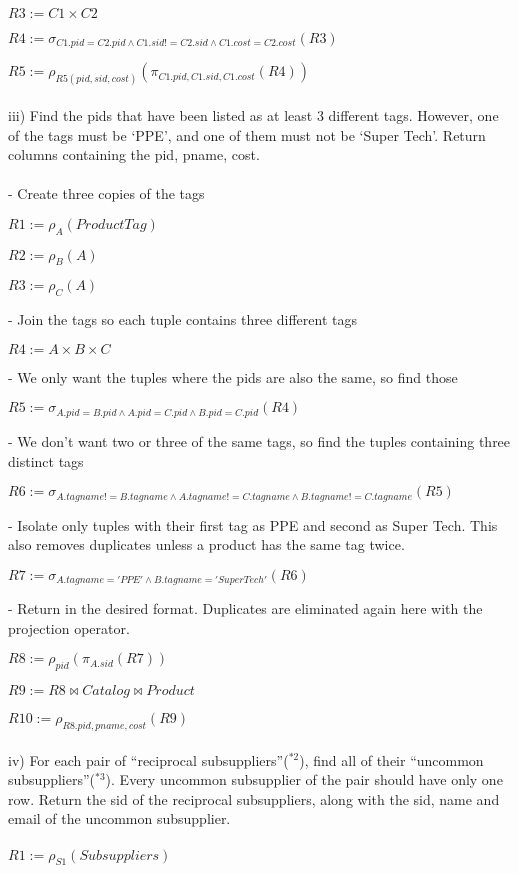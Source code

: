 \documentclass[10pt]{article}
\begin{document}
$R3 := C1 \times C2$

$R4 := \sigma_{C1.pid = C2.pid \wedge C1.sid != C2.sid \wedge C1.cost = C2.cost}(R3)$

$R5 := \rho_{R5(pid, sid, cost)}(\pi_{C1.pid, C1.sid, C1.cost}(R4))$
\\~\\
iii) Find the pids that have been listed as at least 3 different tags. However, one of the tags must be ‘PPE’, and one of them must not be ‘Super Tech’. Return columns containing the pid, pname, cost. 
\\~\\
- Create three copies of the tags

$R1 := \rho_{A}(ProductTag)$

$R2 := \rho_{B}(A)$

$R3 := \rho_{C}(A)$

- Join the tags so each tuple contains three different tags

$R4 := A \times B \times C$

- We only want the tuples where the pids are also the same, so find those

$R5 := \sigma_{A.pid = B.pid \wedge A.pid = C.pid \wedge B.pid = C.pid}(R4)$

- We don't want two or three of the same tags, so find the tuples containing three distinct tags

$R6 := \sigma_{A.tagname != B.tagname \wedge A.tagname != C.tagname \wedge B.tagname != C.tagname}(R5)$

- Isolate only tuples with their first tag as PPE and second as Super Tech. This also removes duplicates unless a product has the same tag twice.

$R7 := \sigma_{A.tagname = 'PPE' \wedge B.tagname = 'Super Tech'}(R6)$

- Return in the desired format. Duplicates are eliminated again here with the projection operator.

$R8 := \rho_{pid}(\pi_{A.sid}(R7))$

$R9 := R8 \bowtie Catalog \bowtie Product$

$R10 := \rho_{R8.pid, pname, cost}(R9)$
\\~\\
iv) For each pair of “reciprocal subsuppliers”($^{*2}$), find all of their “uncommon subsuppliers”($^{*3}$). Every uncommon subsupplier of the pair should have only one row. Return the sid of the reciprocal subsuppliers, along with the sid, name and email of the uncommon subsupplier.
\\~\\
$R1 := \rho_{S1}(Subsuppliers)$
\end{document}
